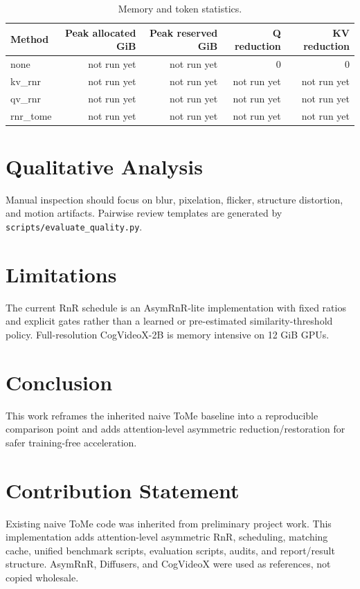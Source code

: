 \documentclass{article}
\begin{document}
\begin{table}[t]
\centering
\caption{Memory and token statistics.}
\begin{tabular}{lrrrr}
\toprule
Method & Peak allocated GiB & Peak reserved GiB & Q reduction & KV reduction \\
\midrule
none & not run yet & not run yet & 0 & 0 \\
kv\_rnr & not run yet & not run yet & not run yet & not run yet \\
qv\_rnr & not run yet & not run yet & not run yet & not run yet \\
rnr\_tome & not run yet & not run yet & not run yet & not run yet \\
\bottomrule
\end{tabular}
\end{table}

\section{Qualitative Analysis}
Manual inspection should focus on blur, pixelation, flicker, structure distortion, and motion artifacts.
Pairwise review templates are generated by \texttt{scripts/evaluate\_quality.py}.

\section{Limitations}
The current RnR schedule is an AsymRnR-lite implementation with fixed ratios and explicit gates rather than a learned or pre-estimated similarity-threshold policy.
Full-resolution CogVideoX-2B is memory intensive on 12 GiB GPUs.

\section{Conclusion}
This work reframes the inherited naive ToMe baseline into a reproducible comparison point and adds attention-level asymmetric reduction/restoration for safer training-free acceleration.

\section{Contribution Statement}
Existing naive ToMe code was inherited from preliminary project work.
This implementation adds attention-level asymmetric RnR, scheduling, matching cache, unified benchmark scripts, evaluation scripts, audits, and report/result structure.
AsymRnR, Diffusers, and CogVideoX were used as references, not copied wholesale.



\end{document}
